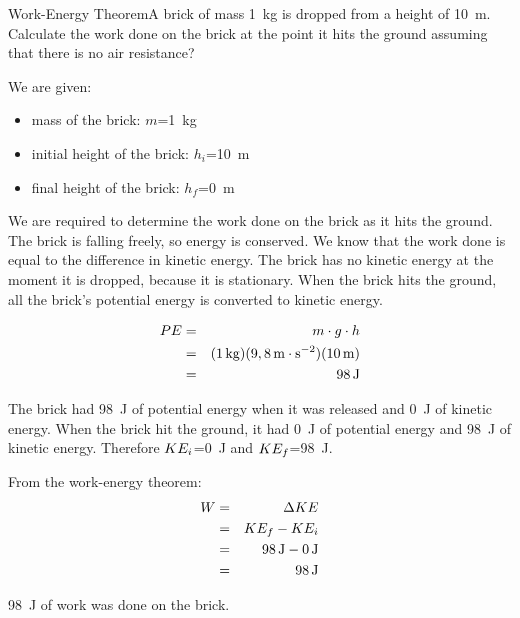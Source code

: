 \begin{wex}{Work-Energy Theorem}{A brick of mass 1~kg is dropped from a height of 10~m. Calculate the work done on the brick at the point it hits the ground assuming that there is no air resistance?}
{
We are given:
\begin{itemize}
\item{mass of the brick: $m$=1~kg}
\item{initial height of the brick: $h_i$=10~m}
\item{final height of the brick: $h_f$=0~m}
\end{itemize}
We are required to determine the work done on the brick as it hits the ground.
The brick is falling freely, so energy is conserved. We know that the work done is equal to the difference in kinetic energy. The brick has no kinetic energy at the moment it is dropped, because it is stationary. When the brick hits the ground, all the brick's potential energy is converted to kinetic energy.

\begin{eqnarray*}
PE&=&m\cdot g \cdot h\\
&=&(1\,\mathrm{kg})(9,8\,\mathrm{m \cdot s^{-2}})(10\,\rm{m})\\
&=&98\,\mathrm{J}
\end{eqnarray*}

The brick had 98~J of potential energy when it was released and 0~J of kinetic energy. When the brick hit the ground, it had 0~J of potential energy and 98~J of kinetic energy. Therefore $KE_i$=0~J and $KE_f$=98~J.

From the work-energy theorem:
\begin{eqnarray*}
W&=&\Delta KE\\
&=&KE_f - KE_i\\
&=&98\,\mathrm{J}-0\,\mathrm{J}\\
&=&98\,\mathrm{J}
\end{eqnarray*}

98~J of work was done on the brick.
}
\end{wex}

